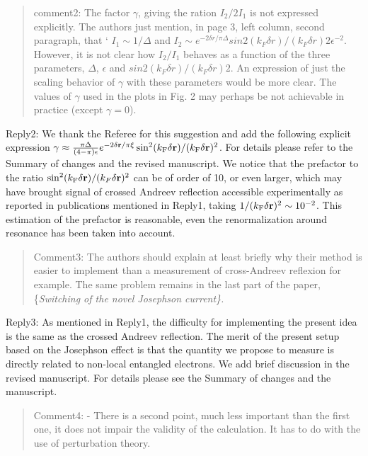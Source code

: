 \documentclass[11pt]{article}
\begin{document}
\begin{quote}
comment2: The factor \(\gamma\), giving the ration \(I_2/2I_1\) is not
expressed explicitly. The authors just mention, in page 3, left column,
second paragraph, that ` \(I_1 \sim 1/\Delta\) and
\(I_2 \sim e^{-2 \delta r/\pi \Delta} sin2(k_F \delta r)/(k_F \delta r)2 \epsilon^{-2}.\)
However, it is not clear how \(I_2/I_1\) behaves as a function of the
three parameters, \(\Delta\), \(\epsilon\) and
\(sin2(k_F \delta r)/(k_F \delta r)2\). An expression of just the
scaling behavior of \(\gamma\) with these parameters would be more
clear. The values of \(\gamma\) used in the plots in Fig. 2 may perhaps
be not achievable in practice (except \(\gamma=0\)).
\end{quote}

Reply2: We thank the Referee for this suggestion and add the following
explicit expression
\(\gamma \approx \frac{\pi \Delta}{(4-\pi) \epsilon } e^{- 2{\delta {\bf r}}/{\pi \xi}}\sin^2(k_{\rm F} \delta {\bf r})/ (k_{\rm F} \delta {\bf r})^2\).
For details please refer to the Summary of changes and the revised
manuscript. We notice that the prefactor to the ratio
\({\rm sin}^2(k_{\rm F} \delta {\bf r})/(k_F \delta {\bf r})^2\) can be
of order of 10, or even larger, which may have brought signal of crossed
Andreev reflection accessible experimentally as reported in publications
mentioned in Reply1, taking
\(1/(k_{\rm F} \delta {\bf r})^2 \sim 10^{-2}\). This estimation of the
prefactor is reasonable, even the renormalization around resonance has
been taken into account.

\begin{quote}
Comment3: The authors should explain at least briefly why their method
is easier to implement than a measurement of cross-Andreev reflexion for
example. The same problem remains in the last part of the paper,
\{\it Switching of the novel Josephson current\}.
\end{quote}

Reply3: As mentioned in Reply1, the difficulty for implementing the
present idea is the same as the crossed Andreev reflection. The merit of
the present setup based on the Josephson effect is that the quantity we
propose to measure is directly related to non-local entangled electrons.
We add brief discussion in the revised manuscript. For details please
see the Summary of changes and the manuscript.

\begin{quote}
Comment4: - There is a second point, much less important than the first
one, it does not impair the validity of the calculation. It has to do
with the use of perturbation theory.
\end{quote}
\end{document}
